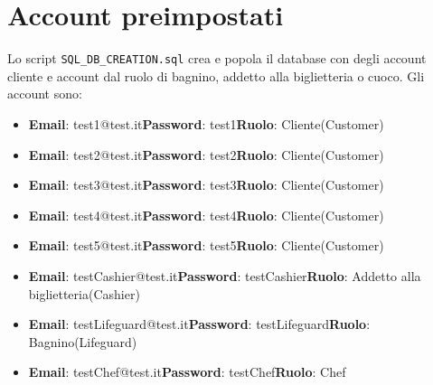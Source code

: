 \documentclass{article}
\begin{document}
\section{Account preimpostati}
Lo script \texttt{SQL\_DB\_CREATION.sql} crea e popola il database con degli account cliente e account dal ruolo di bagnino, addetto alla biglietteria o cuoco.
Gli account sono:
\begin{itemize}
	\item \textbf{Email}: test1@test.it\newline\textbf{Password}: test1\newline\textbf{Ruolo}: Cliente(Customer)
	\item \textbf{Email}: test2@test.it\newline\textbf{Password}: test2\newline\textbf{Ruolo}: Cliente(Customer)
	\item \textbf{Email}: test3@test.it\newline\textbf{Password}: test3\newline\textbf{Ruolo}: Cliente(Customer)
	\item \textbf{Email}: test4@test.it\newline\textbf{Password}: test4\newline\textbf{Ruolo}: Cliente(Customer)
	\item \textbf{Email}: test5@test.it\newline\textbf{Password}: test5\newline\textbf{Ruolo}: Cliente(Customer)
	\item \textbf{Email}: testCashier@test.it\newline\textbf{Password}: testCashier\newline\textbf{Ruolo}: Addetto alla biglietteria(Cashier)
	\item \textbf{Email}: testLifeguard@test.it\newline\textbf{Password}: testLifeguard\newline\textbf{Ruolo}: Bagnino(Lifeguard)
	\item \textbf{Email}: testChef@test.it\newline\textbf{Password}: testChef\newline\textbf{Ruolo}: Chef
\end{itemize}
\newpage
\end{document}
